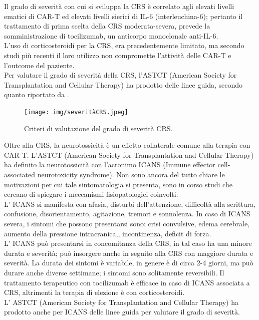 Il grado di severità con cui si sviluppa la CRS è correlato agli elevati livelli ematici di CAR-T ed elevati livelli 
sierici di IL-6 (interleuchina-6); pertanto il trattamento di prima scelta della CRS moderata-severa, 
prevede la somministrazione di tocilizumab, un anticorpo monoclonale anti-IL-6\cite{EMATOCART}.\\
L’uso di corticosteroidi per la CRS, era precedentemente limitato, ma secondo studi più recenti il loro utilizzo 
non compromette l'attività delle CAR-T e l’outcome del paziente\cite{Cortico}.\\
Per valutare il grado di severità della CRS, l’ASTCT (American Society for Transplantation and Cellular Therapy) 
ha prodotto delle linee guida, secondo quanto riportato da \cite{ASTCT}.\\

\begin{figure}[H]
    \begin{center}
    \texttt{[image: img/severitàCRS.jpeg]}
    \end{center}
    \caption[Criteri di valutazione del grado di severità CRS.]{Criteri di valutazione del grado di severità CRS.
    \cite{img26}}

\end{figure}

Oltre alla CRS, la neurotossicità è un effetto collaterale comune alla terapia con CAR-T. 
L’ASTCT (American Society for Transplantation and Cellular Therapy) ha definito la neurotossicità con 
l’acronimo ICANS (Immune effector cell-associated neurotoxicity syndrome). Non sono ancora del tutto chiare le 
motivazioni per cui tale sintomatologia si presenta, sono in corso studi che cercano di spiegare i meccanismi 
fisiopatologici coinvolti.\\
L’ ICANS si manifesta con afasia, disturbi dell’attenzione, difficoltà alla scrittura, confusione, disorientamento, 
agitazione, tremori e sonnolenza. In caso di ICANS severa, i sintomi che possono presentarsi sono: crisi convulsive, 
edema cerebrale, aumento della pressione intracranica,, incontinenza, deficit di forza\cite{EMATOCART}.\\
L’ ICANS può presentarsi in concomitanza della CRS, in tal caso ha una minore durata e severità; può insorgere anche 
in seguito alla CRS con maggiore durata e severità. La durata dei sintomi è variabile, in genere è di circa 2-4 giorni,
ma può durare anche diverse settimane; i sintomi sono solitamente reversibili. 
Il trattamento terapeutico con tocilizumab è efficace in caso di ICANS associata a CRS, altrimenti la terapia di 
elezione è con corticosteroidi\cite{EMATOCART}.\\
L’ ASTCT (American Society for Transplantation and Cellular Therapy) 
ha prodotto anche per ICANS delle linee guida per valutare il grado di severità\cite{ASTCT}.\\

